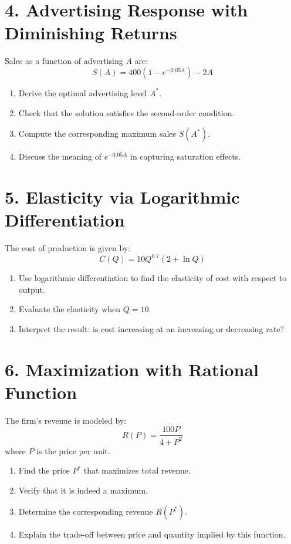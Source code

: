 \documentclass[12pt]{article}
\begin{document}
\section*{4. Advertising Response with Diminishing Returns}

Sales as a function of advertising \(A\) are:
\[
S(A) = 400(1 - e^{-0.05A}) - 2A
\]

\begin{enumerate}
\item Derive the optimal advertising level \(A^*\).
\item Check that the solution satisfies the second-order condition.
\item Compute the corresponding maximum sales \(S(A^*)\).
\item Discuss the meaning of \(e^{-0.05A}\) in capturing saturation effects.
\end{enumerate}



\section*{5. Elasticity via Logarithmic Differentiation}

The cost of production is given by:
\[
C(Q) = 10Q^{0.7}(2 + \ln Q)
\]

\begin{enumerate}
\item Use logarithmic differentiation to find the elasticity of cost with respect to output.
\item Evaluate the elasticity when \(Q = 10\).
\item Interpret the result: is cost increasing at an increasing or decreasing rate?
\end{enumerate}



\section*{6. Maximization with Rational Function}

The firm’s revenue is modeled by:
\[
R(P) = \frac{100P}{4 + P^2}
\]
where \(P\) is the price per unit.

\begin{enumerate}
\item Find the price \(P^*\) that maximizes total revenue.
\item Verify that it is indeed a maximum.
\item Determine the corresponding revenue \(R(P^*)\).
\item Explain the trade-off between price and quantity implied by this function.
\end{enumerate}
\end{document}
